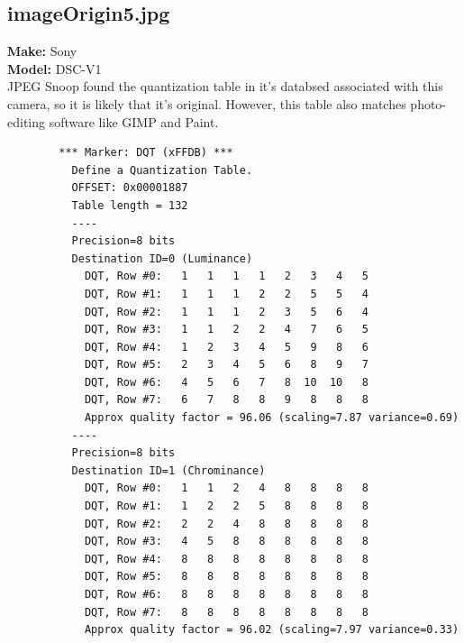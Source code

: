 \documentclass{article}
\begin{document}
\subsection{imageOrigin5.jpg}
	\textbf{Make:} Sony\\
	\textbf{Model:} DSC-V1\\
JPEG Snoop found the quantization table in it's databsed associated
with this camera, so it is likely that it's original. However, this
table also matches photo-editing software like GIMP and Paint.
\begin{lstlisting}
		*** Marker: DQT (xFFDB) ***
		  Define a Quantization Table.
		  OFFSET: 0x00001887
		  Table length = 132
		  ----
		  Precision=8 bits
		  Destination ID=0 (Luminance)
			DQT, Row #0:   1   1   1   1   2   3   4   5 
			DQT, Row #1:   1   1   1   2   2   5   5   4 
			DQT, Row #2:   1   1   1   2   3   5   6   4 
			DQT, Row #3:   1   1   2   2   4   7   6   5 
			DQT, Row #4:   1   2   3   4   5   9   8   6 
			DQT, Row #5:   2   3   4   5   6   8   9   7 
			DQT, Row #6:   4   5   6   7   8  10  10   8 
			DQT, Row #7:   6   7   8   8   9   8   8   8 
			Approx quality factor = 96.06 (scaling=7.87 variance=0.69)
		  ----
		  Precision=8 bits
		  Destination ID=1 (Chrominance)
			DQT, Row #0:   1   1   2   4   8   8   8   8 
			DQT, Row #1:   1   2   2   5   8   8   8   8 
			DQT, Row #2:   2   2   4   8   8   8   8   8 
			DQT, Row #3:   4   5   8   8   8   8   8   8 
			DQT, Row #4:   8   8   8   8   8   8   8   8 
			DQT, Row #5:   8   8   8   8   8   8   8   8 
			DQT, Row #6:   8   8   8   8   8   8   8   8 
			DQT, Row #7:   8   8   8   8   8   8   8   8 
			Approx quality factor = 96.02 (scaling=7.97 variance=0.33)
\end{lstlisting}
\end{document}

